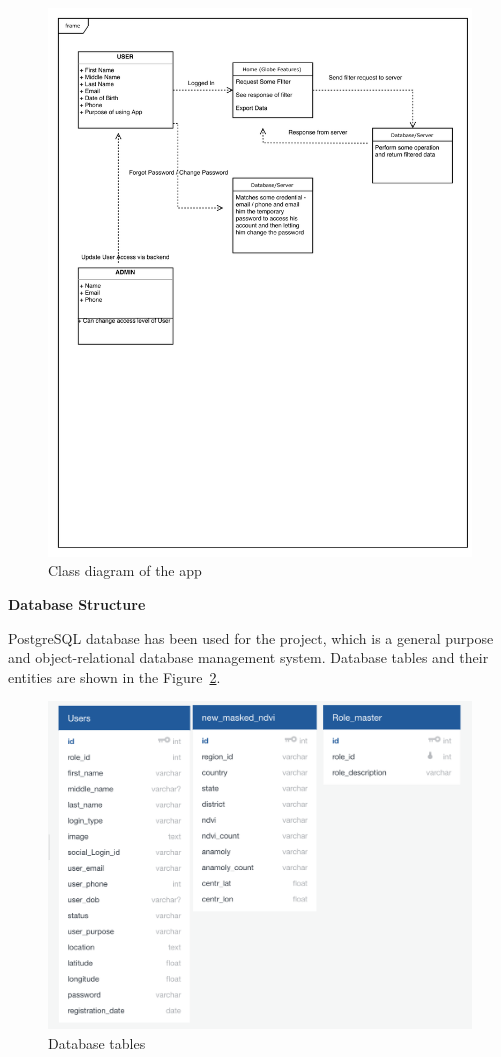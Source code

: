     \begin{figure}[H]
            \centering
            \includegraphics[width=0.8\linewidth]{figures/ch3/classdiagram.png}
            \caption{\label{fig:class_diag} Class diagram of the app}
    \end{figure}
    
    \newpage

 \centerline{\textbf{Database Structure}}    
  PostgreSQL database has been used for the project, which is a general purpose and object-relational database management system. 
  Database tables and their entities are shown in the Figure~\ref{fig:database_structure}.
  
  \begin{figure}[H]
            \centering
            \includegraphics[width=1.0\linewidth]{figures/ch3/database_structure.png}
            \caption{\label{fig:database_structure} Database tables}
    \end{figure}